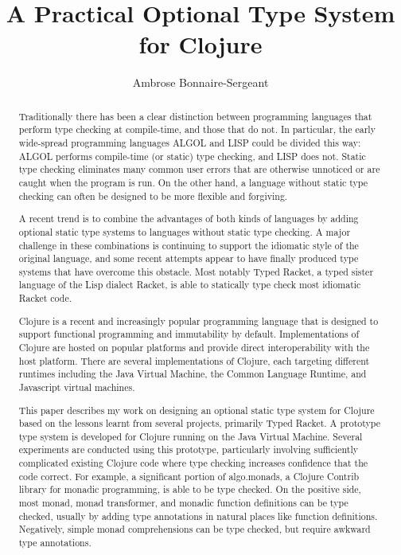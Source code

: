 \documentclass{cshonours}
\title{A Practical Optional Type System for Clojure}
\author{Ambrose Bonnaire-Sergeant}
\begin{document}
\maketitle

\begin{abstract}

Traditionally there has been a clear distinction between 
programming languages that perform type checking at compile-time, and those that do not.
In particular, the early wide-spread programming languages ALGOL and LISP
could be divided this way: ALGOL performs compile-time (or static) type checking,
and LISP does not.
Static type checking eliminates many common user errors that are otherwise unnoticed or are caught 
when the program is run.
On the other hand, a language without static type checking can often be designed 
to be more flexible and forgiving.

A recent trend is to combine the advantages of both kinds of languages by adding optional static 
type systems to languages without static type checking. 
A major challenge in these combinations is continuing to support the idiomatic style of the original 
language, and some recent attempts appear to have finally produced type systems that have overcome this obstacle.  
Most notably Typed Racket, a typed sister language of the Lisp dialect Racket, is able to statically type 
check most idiomatic Racket code.

Clojure is a recent and increasingly popular programming language that is designed to support 
functional programming and immutability by default. Implementations of Clojure are hosted 
on popular platforms and provide direct interoperability with the host platform.
There are several implementations of Clojure, each targeting different runtimes including
the Java Virtual Machine, the Common Language Runtime, and Javascript virtual machines.

This paper describes my work on designing an optional static type system for Clojure based on
the lessons learnt from several projects, primarily Typed Racket.
A prototype type system is developed for Clojure running on the Java Virtual Machine.
Several experiments are conducted using this prototype, particularly involving
sufficiently complicated existing Clojure code where type checking increases confidence that the code correct.
For example, a significant portion of algo.monads, a Clojure Contrib library for monadic programming, 
is able to be type checked. 
On the positive side, most monad, monad transformer, and monadic function definitions can be type checked,
usually by adding type annotations in natural places like function definitions.
Negatively, simple monad comprehensions can be type checked, but require awkward type annotations.


\end{abstract}
\end{document}
